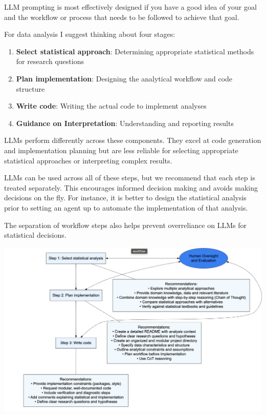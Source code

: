 \documentclass[
  letterpaper,
  DIV=11,
  numbers=noendperiod]{scrreprt}
\providecommand{\tightlist}{%
  \setlength{\itemsep}{0pt}\setlength{\parskip}{0pt}}\usepackage{longtable,booktabs,array}
\begin{document}
LLM prompting is most effectively designed if you have a good idea of
your goal and the workflow or process that needs to be followed to
achieve that goal.

For data analysis I suggest thinking about four stages:

\begin{enumerate}
\def\labelenumi{\arabic{enumi}.}
\tightlist
\item
  \textbf{Select statistical approach}: Determining appropriate
  statistical methods for research questions
\item
  \textbf{Plan implementation}: Designing the analytical workflow and
  code structure
\item
  \textbf{Write code}: Writing the actual code to implement analyses
\item
  \textbf{Guidance on Interpretation}: Understanding and reporting
  results
\end{enumerate}

LLMs perform differently across these components. They excel at code
generation and implementation planning but are less reliable for
selecting appropriate statistical approaches or interpreting complex
results.

LLMs can be used across all of these steps, but we recommend that each
step is treated separately. This encourages informed decision making and
avoids making decisions on the fly. For instance, it is better to design
the statistical analysis prior to setting an agent up to automate the
implementation of that analysis.

The separation of workflow steps also helps prevent overreliance on LLMs
for statistical decisions.

\includegraphics{resources/figure2-brown-spillias.png}
\end{document}
